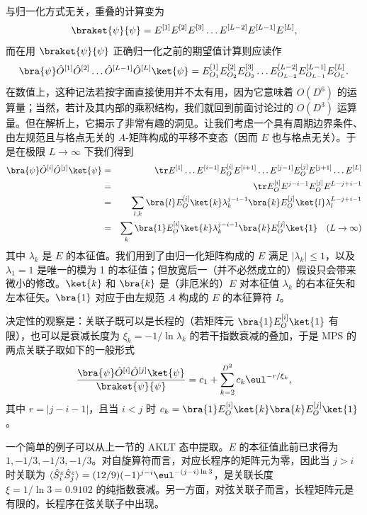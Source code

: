 与归一化方式无关，重叠的计算变为
\begin{equation}
\braket{\psi}{\psi} = E^{[1]} E^{[2]} E^{[3]} \ldots E^{[L-2]} E^{[L-1]} E^{[L]}  ,
\end{equation}
而在用 $\braket{\psi}{\psi}$ 正确归一化之前的期望值计算则应读作
\begin{equation}
\bra{\psi} \hat{O}^{[1]} \hat{O}^{[2]} \ldots \hat{O}^{[L-1]} \hat{O}^{[L]}\ket{\psi} = E^{[1]}_{O_1} E^{[2]}_{O_2} E^{[3]}_{O_3} \ldots E^{[L-2]}_{O_{L-2}} E^{[L-1]}_{O_{L-1}} E^{[L]}_{O_L}  .
\end{equation}
在数值上，这种记法若按字面直接使用并不太有用，因为它意味着 $O(D^6)$ 的运算量；当然，若计及其内部的乘积结构，我们就回到前面讨论过的 $O(D^3)$ 运算量。但在解析上，它揭示了非常有趣的洞见。让我们考虑一个具有周期边界条件、由左规范且与格点无关的 $A$-矩阵构成的平移不变态（因而 $E$ 也与格点无关）。于是在极限 $L\rightarrow\infty$ 下我们得到
\begin{eqnarray*}
\bra{\psi} \hat{O}^{[i]}\hat{O}^{[j]} \ket{\psi} &=& \tr E^{[1]} \ldots E^{[i-1]} E^{[i]}_O E^{[i+1]} \ldots E^{[j-1]}
E^{[j]}_O E^{[j+1]} \ldots E^{[L]} \\
&=& \tr E^{[i]}_O E^{j-i-1} E^{[j]}_O E^{L-j+i-1} \\
&=& \sum_{l,k} \bra{l} E^{[i]}_O \ket{k} \lambda_k^{j-i-1} \bra{k} E^{[j]}_O \ket{l} \lambda_l^{L-j+i-1}\\
&=& \sum_k \bra{1} E^{[i]}_O \ket{k} \lambda_k^{j-i-1} \bra{k} E^{[j]}_O \ket{1} \quad (L\rightarrow\infty)
\end{eqnarray*}
其中 $\lambda_k$ 是 $E$ 的本征值。我们用到了由归一化矩阵构成的 $E$ 满足 $|\lambda_k|\leq 1$，以及 $\lambda_1=1$ 是唯一的模为 1 的本征值；但放宽后一（并不必然成立的）假设只会带来微小的修改。$\ket{k}$ 和 $\bra{k}$ 是（非厄米的）$E$ 对本征值 $\lambda_k$ 的右本征矢和左本征矢。$\bra{1}$ 对应于由左规范 $A$ 构成的 $E$ 的本征算符 $I$。

决定性的观察是：关联子既可以是长程的（若矩阵元 $ \bra{1} E^{[i]}_O \ket{1}$ 有限），也可以是衰减长度为 $\xi_k = -1/ \ln \lambda_k$ 的若干指数衰减的叠加，于是 MPS 的两点关联子取如下的一般形式
\begin{equation}
\frac{\bra{\psi} \hat{O}^{[i]} \hat{O}^{[j]} \ket{\psi}}{\braket{\psi}{\psi}} = c_1 + \sum_{k=2}^{D^2} c_k \eul^{-r/\xi_k} ,
\end{equation}
其中 $r=|j-i-1|$，且当 $i<j$ 时 $c_k = \bra{1} E^{[i]}_O \ket{k} \bra{k} E^{[j]}_O \ket{1}$。

一个简单的例子可以从上一节的 AKLT 态中提取。$E$ 的本征值此前已求得为 $1,-1/3,-1/3,-1/3$。对自旋算符而言，对应长程序的矩阵元为零，因此当 $j>i$ 时关联为 $\langle \hat{S}_i^z \hat{S}_j^z \rangle = (12/9)(-1)^{j-i} \eul^{-(j-i)\ln 3}$，是关联长度 $\xi = 1/\ln 3= 0.9102$ 的纯指数衰减。另一方面，对弦关联子而言，长程矩阵元是有限的，长程序在弦关联子中出现。

